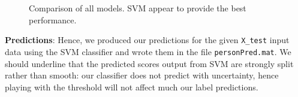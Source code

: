 \documentclass[10pt,a4paper]{article}
\begin{document}
   \begin{figure}[ht]
       \center
    	\hfill
	\caption{Comparison of all models. SVM appear to provide the best performance.}
  \end{figure}

  \textbf{Predictions}: Hence, we produced our predictions for the given \texttt{X\_test} input data using the SVM classifier and wrote them in the file \texttt{personPred.mat}. We should underline that the predicted scores output from SVM are strongly split rather than smooth: our classifier does not predict with uncertainty, hence playing with the threshold will not affect much our label predictions.
\end{document}
